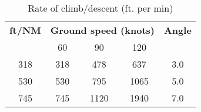 {}

{}

\begin{table}[H]
    \caption{Rate of climb/descent (ft. per min)}

    \begin{center}
        \begin{tabular}{ccccc}
            \toprule
            \textbf{ft/NM} & \multicolumn{3}{c}{\textbf{Ground speed (knots)}} & \textbf{Angle}
            \\\cmidrule(lr){2-4}
                           & 60                                                & 90             & 120  &                  \\
            \midrule
            318            & 318                                               & 478            & 637  & 3.0\textdegree{} \\
            530            & 530                                               & 795            & 1065 & 5.0\textdegree{} \\
            745            & 745                                               & 1120           & 1940 & 7.0\textdegree{} \\
            \bottomrule
        \end{tabular}
    \end{center}
\end{table}

{}

